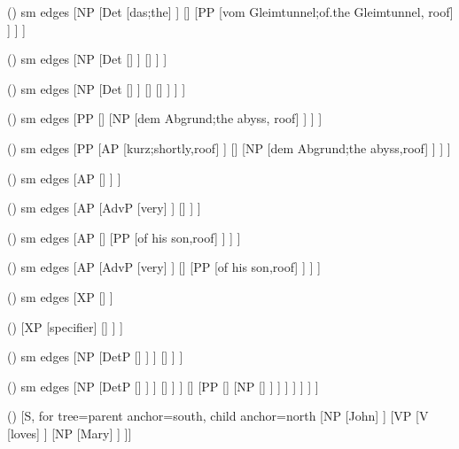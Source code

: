 \begin {forest}()
 sm edges [NP [Det [das;the] ] [\nbar [N [\trace ] ] [PP [vom Gleimtunnel;of.the Gleimtunnel, roof] ] ] ] \end {forest}
\begin {forest}()
 sm edges [NP [Det [\trace ] ] [\nbar [N [Frauen;women] ] ] ] \end {forest}
\begin {forest}()
 sm edges [NP [Det [\trace ] ] [\nbar [A [klugen;smart] ] [\nbar [N [\trace ] ] ] ] ] \end {forest}
\begin {forest}()
 sm edges [PP [\pbar [P [vor;before] ] [NP [dem Abgrund;the abyss, roof] ] ] ] \end {forest}
\begin {forest}()
 sm edges [PP [AP [kurz;shortly,roof] ] [\pbar [P [vor;before] ] [NP [dem Abgrund;the abyss,roof] ] ] ] \end {forest}
\begin {forest}()
 sm edges [AP [\abar [A [proud] ] ] ] \end {forest}
\begin {forest}()
 sm edges [AP [AdvP [very] ] [\abar [A [proud] ] ] ] \end {forest}
\begin {forest}()
 sm edges [AP [\abar [A [proud] ] [PP [of his son,roof] ] ] ] \end {forest}
\begin {forest}()
 sm edges [AP [AdvP [very] ] [\abar [A [proud] ] [PP [of his son,roof] ] ] ] \end {forest}
\begin {forest}()
 sm edges [XP [\xbar [X] ] ] \end {forest}
\begin {forest}()
 [XP [specifier] [\xbar [adjunct] [\xbar [complement] [X] ] ] ] \end {forest}
\begin {forest}()
 sm edges [NP [DetP [\detbar [Det [das;the] ] ] ] [\nbar [N [Bild;picture] ] ] ] \end {forest}
\begin {forest}()
 sm edges [NP [DetP [\detbar [Det [das;the] ] ] ] [\nbar [AP [\abar [A [schöne;beautiful] ] ] ] [\nbar [N [Bild;picture] ] [PP [\pbar [P [von;of] ] [NP [\nbar [N [Paris;Paris] ] ] ] ] ] ] ] ] \end {forest}
\begin {forest}()
 [S, for tree={parent anchor=south, child anchor=north} [NP [John] ] [VP [V [loves] ] [NP [Mary] ] ]] \end {forest}
